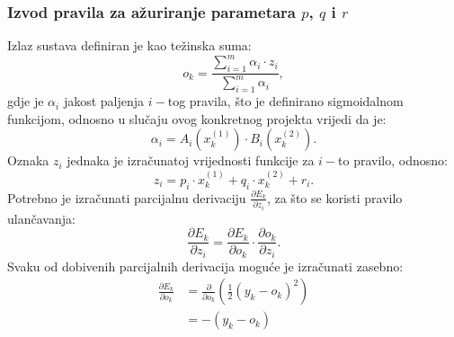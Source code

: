 \documentclass[12pt, a4paper, numeric]{article}
\begin{document}
\subsubsection{Izvod pravila za ažuriranje parametara $p$, $q$ i $r$}
Izlaz sustava definiran je kao težinska suma:
\[
    o_k = \frac{\sum_{i=1}^{m}\alpha_i\cdot z_i}{\sum_{i=1}^{m}\alpha_i},
\]
gdje je $\alpha_i$ jakost paljenja $i-$tog pravila, što je definirano sigmoidalnom funkcijom, odnosno u slučaju ovog konkretnog projekta vrijedi da je:
\[
    \alpha_i = A_i(x_k^{(1)}) \cdot B_i(x_k^{(2)}).
\]
Oznaka $z_i$ jednaka je izračunatoj vrijednosti funkcije za $i-$to pravilo, odnosno:
\[
    z_i = p_i\cdot x_k^{(1)} + q_i\cdot x_k^{(2)} + r_i.
\]
Potrebno je izračunati parcijalnu derivaciju $\frac{\partial E_k}{\partial z_i}$, za što se koristi pravilo ulančavanja:
\[
    \frac{\partial E_k}{\partial z_i} = \frac{\partial E_k}{\partial o_k} \cdot \frac{\partial o_k}{\partial z_i}.
\]
Svaku od dobivenih parcijalnih derivacija moguće je izračunati zasebno:
\begin{equation*}
    \begin{split}
        \frac{\partial E_k}{\partial o_k}
            & = \frac{\partial}{\partial o_k}(
                \frac{1}{2}(y_k - o_k)^2)\\
            & = -(y_k - o_k)
    \end{split}
\end{equation*}
\end{document}
